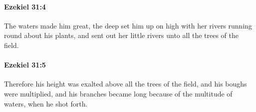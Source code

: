 		\paragraph{Ezekiel 31:4} %
			\label{EZEKIEL-31-4}

			The waters made him great, the deep set him up on high with her rivers running round about his plants, and sent out her little rivers unto all the trees of the field.


		\paragraph{Ezekiel 31:5} %
			\label{EZEKIEL-31-5}

			Therefore his height was exalted above all the trees of the field, and his boughs were multiplied, and his branches became long because of the multitude of waters, when he shot forth.


